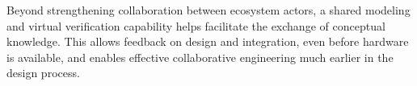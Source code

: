 Beyond strengthening collaboration between ecosystem actors, a shared modeling and virtual verification capability helps 
facilitate the exchange of conceptual knowledge. 
This allows feedback on design and integration, even before hardware is available, and enables effective collaborative engineering much earlier in the design process.



